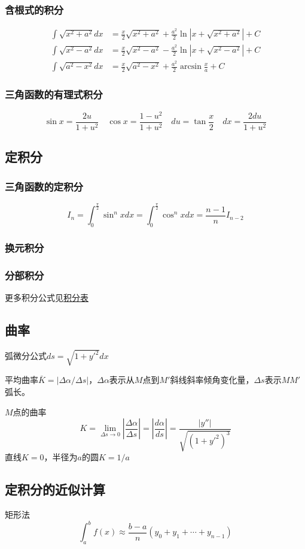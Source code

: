 \subsubsection{含根式的积分}
\begin{align*}
    \int \sqrt{x^{2}+a^{2}} d x&=\frac{x}{2} \sqrt{x^{2}+a^{2}}+\frac{a^{2}}{2} \ln \left|x+\sqrt{x^{2}+a^{2}}\right|+C \\
     \int \sqrt{x^{2}-a^{2}} d x&=\frac{x}{2} \sqrt{x^{2}-a^{2}}-\frac{a^{2}}{2} \ln \left|x+\sqrt{x^{2}-a^{2}}\right|+C \\ 
     \int \sqrt{a^{2}-x^{2}} d x&=\frac{x}{2} \sqrt{a^{2}-x^{2}}+\frac{a^{2}}{2} \arcsin \frac{x}{a}+C
\end{align*}
\subsubsection{三角函数的有理式积分}
\[\sin x=\frac{2u}{1+u^2}\quad \cos x=\frac{1-u^2}{1+u^2}\quad du=\tan\frac x2\quad dx=\frac{2du}{1+u^2}\]
\subsection{定积分}
\subsubsection{三角函数的定积分}
\[
I_{n}=\int_{0}^{\frac{\pi}{2}} \sin ^{n} x d x=\int_{0}^{\frac{\pi}{2}} \cos ^{n} x d x=\frac{n-1}{n} I_{n-2}
\]
\subsubsection{换元积分}
\subsubsection{分部积分}
更多积分公式见\href{https://zh.wikipedia.org/wiki/积分表}{积分表}
\subsection{曲率}
弧微分公式$ds=\sqrt{1+y'^2}dx$

平均曲率$\bar{K}=|\Delta\alpha/\Delta s|$，$\Delta\alpha $表示从$M$点到$M'$斜线斜率倾角变化量，$\Delta s$表示$MM'$弧长。

$M$点的曲率
\[K=\lim_{\Delta s\to 0}\left| \frac{\Delta \alpha}{\Delta s}\right|=\left| \frac{d \alpha}{d s}\right|=\frac{|y''|}{\sqrt{(1+y'^2)^3}}
\]
直线$K=0$，半径为$a$的圆$K= 1/a$
\subsection{定积分的近似计算}
矩形法
\[
\int_{a}^{b} f(x) \approx \frac{b-a}{n}\left(y_{0}+y_{1}+\cdots+y_{n-1}\right)
\]


